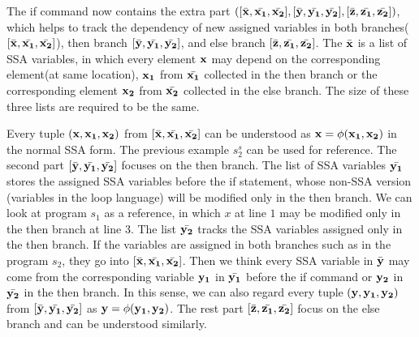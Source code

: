 The if command now contains the extra part $([\bar{{\bf{{x}}}}, \bar{{\bf{{x_1}}}}, \bar{{\bf{{x_2}}}}] , [\bar{{\bf{{y}}}}, \bar{{\bf{{y_1}}}}, \bar{{\bf{{y_2}}}}],[\bar{{\bf{{z}}}}, \bar{{\bf{{z_1}}}}, \bar{{\bf{{z_2}}}}] )$, which helps to track the dependency of new assigned variables in both branches($[\bar{{\bf{{x}}}}, \bar{{\bf{{x_1}}}}, \bar{{\bf{{x_2}}}}]$), then branch $[\bar{{\bf{{y}}}}, \bar{{\bf{{y_1}}}}, \bar{{\bf{{y_2}}}}]$, and else branch $[\bar{{\bf{{z}}}}, \bar{{\bf{{z_1}}}}, \bar{{\bf{{z_2}}}}] $. 
The $\bar{{\bf{{x}}}}$ is a list of SSA variables, in which every element ${\bf{{x}}}$ may depend on the corresponding element(at same location), ${\bf{{x_1}}}$ from $\bar{{\bf{{x_1}}}}$ collected in the then branch or the corresponding element ${\bf{{x_2}}}$ from $\bar{{\bf{{x_2}}}}$ collected in the else branch. The size of these three lists are required to be the same.

Every tuple $({\bf{{x,x_1,x_2 }}})$ from $[\bar{{\bf{{x}}}}, \bar{{\bf{{x_1}}}}, \bar{{\bf{{x_2}}}}]$ can be understood as ${\bf{{x}}} = \phi({\bf{{x_1,x_2}}})$ in the normal SSA form. The previous example $s_2^{s}$ can be used for reference. The second part $[\bar{{\bf{{y}}}}, \bar{{\bf{{y_1}}}}, \bar{{\bf{{y_2}}}}]$ focuses on the then branch. The list of SSA variables $\bar{{\bf{{y_1}}}}$ stores the assigned SSA variables before the if statement, whose non-SSA version (variables in the {loop} language) will be modified only in the then branch. We can look at program $s_1$ as a reference, in which $x$ at line $1$ may be modified only in the then branch at line $3$. The list $\bar{{\bf{{y_2}}}}$ tracks the SSA variables assigned only in the then branch. If the variables are assigned in both branches such as in the program $s_2$, they go into $[\bar{{\bf{{x}}}}, \bar{{\bf{{x_1}}}}, \bar{{\bf{{x_2}}}}]$. Then we think every SSA variable in $\bar{{\bf{{y}}}}$ may come from the corresponding variable ${\bf{{y_1}}}$ in $\bar{{\bf{{y_1}}}}$ before the if command or ${\bf{{y_2}}}$ in $\bar{{\bf{{y_2}}}}$ in the then branch. In this sense, we can also regard every tuple $({\bf{{y,y_1,y_2 }}})$ from $[\bar{{\bf{{y}}}}, \bar{{\bf{{y_1}}}}, \bar{{\bf{{y_2}}}}]$ as ${\bf{{y}}} = \phi({\bf{{y_1,y_2}}})$.  The rest part $[\bar{{\bf{{z}}}}, \bar{{\bf{{z_1}}}}, \bar{{\bf{{z_2}}}}]$ focus on the else branch and can be understood similarly.

